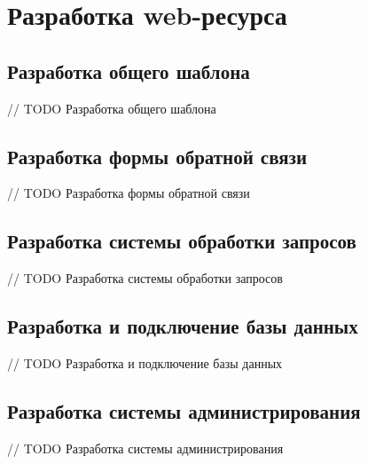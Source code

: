 \section{Разработка web-ресурса}
    \subsection{Разработка общего шаблона}
    // TODO Разработка общего шаблона
    
    \subsection{Разработка формы обратной связи}
    // TODO Разработка формы обратной связи
    
    \subsection{Разработка системы обработки запросов}
    // TODO Разработка системы обработки запросов
    
    \subsection{Разработка и подключение базы данных}
    // TODO Разработка и подключение базы данных
    
    \subsection{Разработка системы администрирования}
    // TODO Разработка системы администрирования
    

\clearpage
